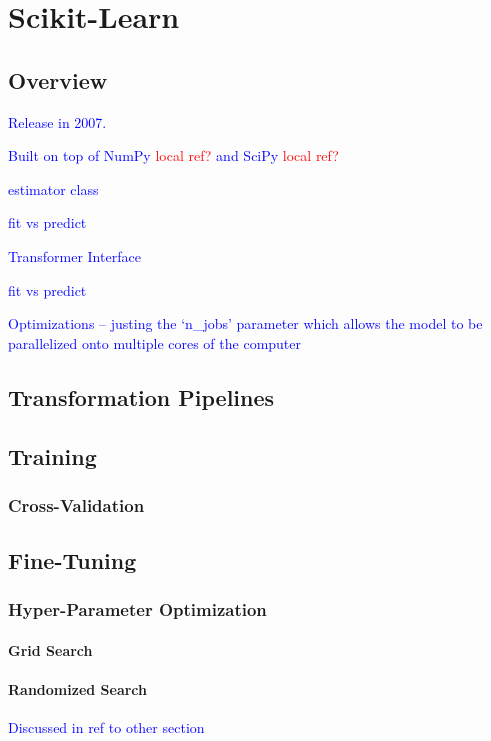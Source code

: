 \section{Scikit-Learn}

\subsection{Overview}

\textcolor{blue}{Release in 2007.}

\textcolor{blue}{Built on top of NumPy \textcolor{red}{local ref?} and SciPy \textcolor{red}{local ref?}}

\textcolor{blue}{estimator class}

\textcolor{blue}{fit vs predict}

\textcolor{blue}{Transformer Interface}

\textcolor{blue}{fit vs predict}

\textcolor{blue}{Optimizations -- justing the `n\_jobs' parameter which allows the model to be parallelized onto multiple cores of the computer}


\subsection{Transformation Pipelines}

\subsection{Training}

\subsubsection{Cross-Validation}

\subsection{Fine-Tuning}

\subsubsection{Hyper-Parameter Optimization}

\paragraph{Grid Search}

\paragraph{Randomized Search}

\textcolor{blue}{Discussed in ref to other section}